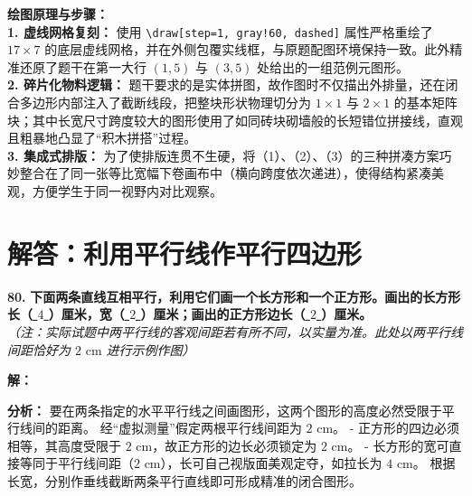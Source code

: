\vspace{0.4cm}
{\small\color{blue!70!black}
\textbf{绘图原理与步骤：}\\
\textbf{1. 虚线网格复刻：} 使用 \texttt{\textbackslash draw[step=1, gray!60, dashed]} 属性严格重绘了 $17 \times 7$ 的底层虚线网格，并在外侧包覆实线框，与原题配图环境保持一致。此外精准还原了题干在第一大行 $(1,5)$ 与 $(3,5)$ 处给出的一组范例元图形。\\
\textbf{2. 碎片化物料逻辑：} 题干要求的是实体拼图，故作图时不仅描出外排量，还在闭合多边形内部注入了截断线段，把整块形状物理切分为 $1\times 1$ 与 $2\times 1$ 的基本矩阵块；其中长宽尺寸跨度较大的图形使用了如同砖块砌墙般的长短错位拼接线，直观且粗暴地凸显了“积木拼搭”过程。\\
\textbf{3. 集成式排版：} 为了使排版连贯不生硬，将（1）、（2）、（3）的三种拼凑方案巧妙整合在了同一张等比宽幅下卷画布中（横向跨度依次递进），使得结构紧凑美观，方便学生于同一视野内对比观察。
}

\newpage


\section{解答：利用平行线作平行四边形}

\vspace{0.6cm}

\textbf{\LARGE 80.} \textbf{下面两条直线互相平行，利用它们画一个长方形和一个正方形。画出的长方形长（\underline{ $4$ }）厘米，宽（\underline{ $2$ }）厘米；画出的正方形边长（\underline{ $2$ }）厘米。}
\\ \textit{（注：实际试题中两平行线的客观间距若有所不同，以实量为准。此处以两平行线间距恰好为 $2\text{ cm}$ 进行示例作图）}

\vspace{0.4cm}
\textbf{解：}

\textbf{分析：}
要在两条指定的水平平行线之间画图形，这两个图形的高度必然受限于平行线间的距离。
经“虚拟测量”假定两根平行线间距为 $2\text{ cm}$。
- 正方形的四边必须相等，其高度受限于 $2\text{ cm}$，故正方形的边长必须锁定为 $2\text{ cm}$。
- 长方形的宽可直接等同于平行线间距（$2\text{ cm}$），长可自己视版面美观定夺，如拉长为 $4\text{ cm}$。
根据长宽，分别作垂线截断两条平行直线即可形成精准的闭合图形。

